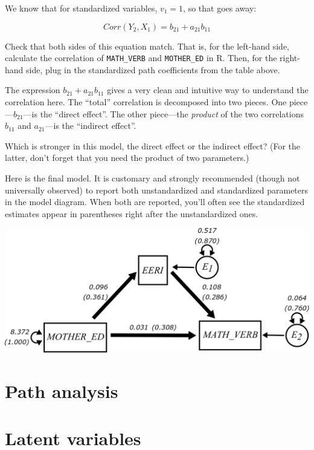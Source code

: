 \documentclass[
]{book}
\begin{document}
We know that for standardized variables, \(v_{1} = 1\), so that goes away:

\[
Corr(Y_{2}, X_{1})  = b_{21} + a_{21}b_{11}
\]

Check that both sides of this equation match. That is, for the left-hand side, calculate the correlation of \texttt{MATH\_VERB} and \texttt{MOTHER\_ED} in R. Then, for the right-hand side, plug in the standardized path coefficients from the table above.

The expression \(b_{21} + a_{21}b_{11}\) gives a very clean and intuitive way to understand the correlation here. The ``total'' correlation is decomposed into two pieces. One piece---\(b_{21}\)---is the ``direct effect''. The other piece---the \emph{product} of the two correlations \(b_{11}\) and \(a_{21}\)---is the ``indirect effect''.

Which is stronger in this model, the direct effect or the indirect effect? (For the latter, don't forget that you need the product of two parameters.)

Here is the final model. It is customary and strongly recommended (though not universally observed) to report both unstandardized and standardized parameters in the model diagram. When both are reported, you'll often see the standardized estimates appear in parentheses right after the unstandardized ones.

\begin{center}\includegraphics{graphics/mediation_nls97_params} \end{center}

\hypertarget{path}{%
\chapter{Path analysis}\label{path}}

\hypertarget{latent}{%
\chapter{Latent variables}\label{latent}}
\end{document}

